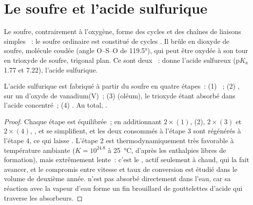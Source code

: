 \section{Le soufre et l'acide sulfurique}

Le soufre, contrairement à l'oxygène, forme des cycles et des chaînes de
liaisons simples ~: le soufre ordinaire est constitué de cycles
. Il brûle en dioxyde de soufre, molécule coudée (angle O--S--O
de \ang{119.5}), qui peut être oxydée à son tour en trioxyde de soufre,
trigonal plan. Ce sont deux ~:  donne l'acide
sulfureux ($\mathrm{p}K_a$ 1.77 et 7.22),  l'acide sulfurique.

\begin{proposition}\label{prop:b1:p-block-16-18:contact-steps}
L'acide sulfurique est fabriqué à partir du soufre en quatre étapes~:
(1) ~; (2) , sur un 
d'oxyde de vanadium(V)~; (3)  (oléum), le
trioxyde étant absorbé dans l'acide concentré~; (4)
. Au total,
.
\end{proposition}

\begin{proof}
Chaque étape est équilibrée~; en additionnant $2\times(1)$, (2),
$2\times(3)$ et
$2\times(4)$, ,  et  se simplifient, et les
deux  consommés à l'étape 3 sont régénérés à l'étape 4, ce
qui laisse
. L'étape 2 est thermodynamiquement très
favorable à température ambiante ($K = 10^{24.8}$ à \qty{25}{\celsius},
d'après les enthalpies libres de formation), mais extrêmement lente~:
c'est le , actif seulement à chaud, qui la fait avancer, et
le compromis entre vitesse et taux de conversion est étudié dans le
volume de deuxième année.  n'est pas absorbé directement dans
l'eau, car sa réaction avec la vapeur d'eau forme un fin brouillard de
gouttelettes d'acide qui traverse les absorbeurs.
\end{proof}

